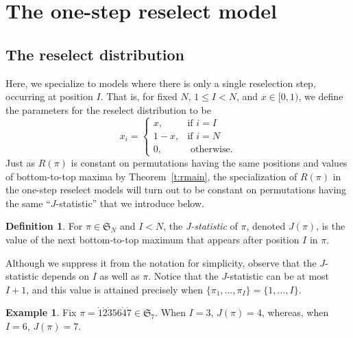 \documentclass[11pt]{amsart}   %
\theoremstyle{definition}
\newtheorem{definition}[theorem]{Definition}
\newtheorem{example}[theorem]{Example}
\theoremstyle{remark}
\numberwithin{equation}{section}
\theoremstyle{theorem}
\renewcommand{\S}{\mathcal{S}}
\renewcommand{\S}{\mathfrak{S}}
\begin{document}
\bigskip
\section{The one-step reselect model}\label{s:3}

\bigskip
\subsection{The reselect distribution}

Here, we specialize to models where there is only a single reselection step, occurring at position $I$.  That is, for fixed $N$, $1 \leq I < N$, and $x \in [0, 1)$, we define the parameters for the reselect distribution to be
\begin{equation*}
x_i = \begin{cases}
x, & \text{if } i=I \\
1-x, & \text{if } i=N\\
0, & \text{ otherwise}.
\end{cases}
\end{equation*}
Just as $R(\pi)$ is constant on permutations having the same positions and values of bottom-to-top maxima by Theorem~\ref{t:rmain}, the specialization of $R(\pi)$ in the one-step reselect models will turn out to be constant on permutations having the same ``$J$-statistic'' that we introduce below.

\begin{definition}
For $\pi \in \S_{N}$ and $I < N$, the \textit{J-statistic} of $\pi$, denoted $J(\pi)$, is the value of the next bottom-to-top maximum that appears after position $I$ in $\pi$.
\end{definition}

Although we suppress it from the notation for simplicity, observe that the $J$-statistic depends on $I$ as well as $\pi$.  Notice that the $J$-statistic can be at most $I+1$, and this value is attained precisely when $\{\pi_1,\dots, \pi_{I}\} = \{1,\dots, I\}$.

\begin{example}
Fix $\pi=\dot1\dot2\dot356\dot4\dot7\in \S_7$. When $I=3$, $J(\pi)=4$, whereas, when $I=6$, $J(\pi)=7$.
\end{example}
\end{document}
